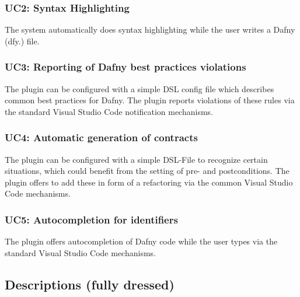 \subsubsection{UC2: Syntax Highlighting}
The system automatically does syntax highlighting while the user writes a Dafny (dfy.) file.
\subsubsection{UC3: Reporting of Dafny best practices violations}
The plugin can be configured with a simple DSL config file which describes common best practices for Dafny. The plugin reports violations of these rules via the standard Visual Studio Code notification mechanisms.
\subsubsection{UC4: Automatic generation of contracts}
The plugin can be configured with a simple DSL-File to recognize certain situations, which could benefit from the setting of pre- and postconditions. The plugin offers to add these in form of a refactoring via the common Visual Studio Code mechanisms.
\subsubsection{UC5: Autocompletion for identifiers}
The plugin offers autocompletion of Dafny code while the user types via the standard Visual Studio Code mechanisms.
\subsection{Descriptions (fully dressed)}

